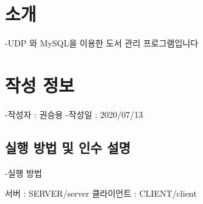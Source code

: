 \hypertarget{index_intro}{}\section{소개}\label{index_intro}
-\/\-U\-D\-P 와 My\-S\-Q\-L을 이용한 도서 관리 프로그램입니다 \hypertarget{index_CreateInfo}{}\section{작성 정보}\label{index_CreateInfo}
-\/작성자 \-: 권승용 -\/작성일 \-: 2020/07/13 \hypertarget{index_exec}{}\subsection{실행 방법 및 인수 설명}\label{index_exec}
-\/실행 방법\par
 서버 \-: S\-E\-R\-V\-E\-R/server 클라이언트 \-: C\-L\-I\-E\-N\-T/client 